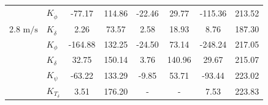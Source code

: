 \begin{table}[]
\begin{tabular}{llcccccc}
                                                   & $K_{\dot{\phi}} $                                                  & -77.17                                      & 114.86                                              & -22.46                                      & 29.77                                               & -115.36                                     & 213.52                                              \\
    \multirow{-2}{*}{2.8 $\si{\meter\per\second}$} & $K_{\dot{\delta}}$                                                 & 2.26                                        & 73.57                                               & 2.58                                        & 18.93                                               & 8.76                                        & 187.30                                              \\
                                                   & $K_{\phi} $                                                        & -164.88                                     & 132.25                                              & -24.50                                      & 73.14                                               & -248.24                                     & 217.05                                              \\
                                                   & $K_\delta $                                                        & 32.75                                       & 150.14                                              & 3.76                                        & 140.96                                              & 29.67                                       & 215.07                                              \\
                                                   & $K_\psi $                                                          & -63.22                                      & 133.29                                              & -9.85                                       & 53.71                                               & -93.44                                      & 223.02                                              \\
                                                   & $K_{T_\delta}$                                                     & 3.51                                        & 176.20                                              & -                                           & -                                                   & 7.53                                        & 223.83                                              \\ \cline{2-8} 

\end{tabular}
\end{table}
